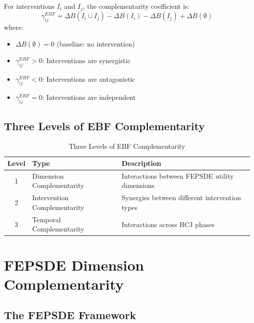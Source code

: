 \begin{theorem}
For interventions $I_i$ and $I_j$, the complementarity coefficient is:
\begin{equation}
\gamma^{EBF}_{ij} = \Delta B(I_i \cup I_j) - \Delta B(I_i) - \Delta B(I_j) + \Delta B(\emptyset)
\end{equation}
where:
\begin{itemize}[noitemsep]
    \item $\Delta B(\emptyset) = 0$ (baseline: no intervention)
    \item $\gamma^{EBF}_{ij} > 0$: Interventions are synergistic
    \item $\gamma^{EBF}_{ij} < 0$: Interventions are antagonistic
    \item $\gamma^{EBF}_{ij} = 0$: Interventions are independent
\end{itemize}
\end{theorem}

\subsection{Three Levels of EBF Complementarity}

\begin{table}[h]
\centering
\caption{Three Levels of EBF Complementarity}
\label{tab:ebf-levels}
\renewcommand{\arraystretch}{1.4}
\begin{tabular}{@{}clp{6cm}@{}}
\toprule
\textbf{Level} & \textbf{Type} & \textbf{Description} \\
\midrule
1 & Dimension Complementarity & Interactions between FEPSDE utility dimensions \\
2 & Intervention Complementarity & Synergies between different intervention types \\
3 & Temporal Complementarity & Interactions across BCJ phases \\
\bottomrule
\end{tabular}
\end{table}

\section{FEPSDE Dimension Complementarity}
\label{sec:fepsde}

\subsection{The FEPSDE Framework}

